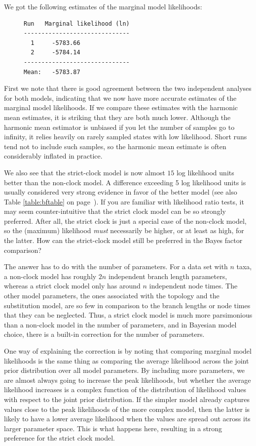 \documentclass[12pt]{book}
\begin{document}
We got the following estimates of the marginal model likelihoods:

\begin{figure}[h]
\centering
\begin{BVerbatim}
Run   Marginal likelihood (ln)
------------------------------
  1     -5783.66
  2     -5784.14
------------------------------
Mean:   -5783.87
\end{BVerbatim}
\end{figure}

First we note that there is good agreement between the two independent analyses for both models,
indicating that we now have more accurate estimates of the marginal model likelihoods. If we
compare these estimates with the harmonic mean estimates, it is striking that they are both much
lower.  Although the harmonic mean estimator is unbiased if you let the number of samples go to
infinity, it relies heavily on rarely sampled states with low likelihood. Short runs tend not to
include such samples, so the harmonic mean estimate is often considerably inflated in practice.

We also see that the strict-clock model is now almost $15$ log likelihood units better than the
non-clock model. A difference exceeding 5 log likelihood units is usually considered very strong
evidence in favor of the better model \citep{kass95} (see also Table \ref{table:bftable} on 
page~\pageref{table:bftable}). If you are familiar with likelihood ratio tests, it may seem 
counter-intuitive that the strict clock model can be so strongly preferred. After all, the strict
clock is just a special case of the non-clock model, so the (maximum) likelihood \emph{must} 
necessarily be  higher, or at least as high, for the latter. How can the strict-clock model still 
be preferred in the Bayes factor comparison?

The answer has to do with the number of parameters. For a data set with $n$ taxa, a non-clock model
has roughly $2n$ independent branch length parameters, whereas a strict clock model only has around
$n$ independent node times. The other model parameters, the ones associated with the topology and
the substitution model, are so few in comparison to the branch lengths or node times that they can
be neglected. Thus, a strict clock model is much more parsimonious than a non-clock model in the
number of parameters, and in Bayesian model choice, there is a built-in correction for the number
of parameters.

One way of explaining the correction is by noting that comparing marginal model likelihoods is the
same thing as comparing the average likelihood across the joint prior distribution over all model
parameters. By including more parameters, we are almost always going to increase the peak
likelihoods, but whether the average likelihood increases is a complex function of the distribution
of likelihood values with respect to the joint prior distribution. If the simpler model already
captures values close to the peak likelihoods of the more complex model, then the latter is likely
to have a lower average likelihood when the values are spread out across its larger parameter
space. This is what happens here, resulting in a strong preference for the strict clock model.
\end{document}
